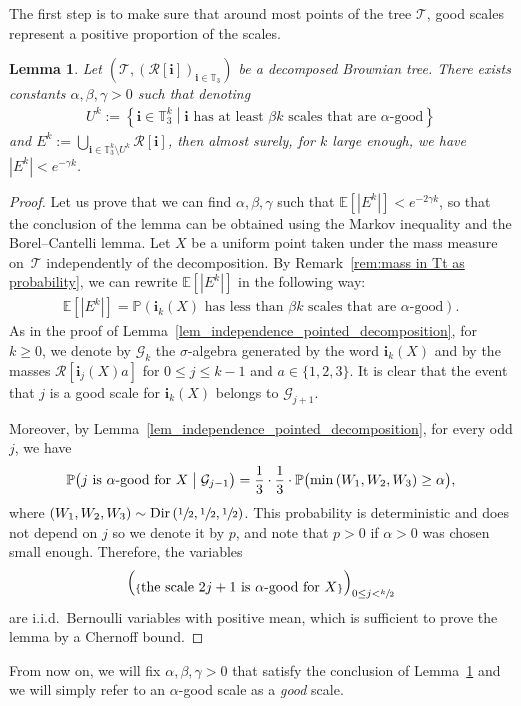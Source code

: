 \documentclass[11pt]{article}
\makeatletter
\let\backslash\setminus
\DeclareRobustCommand{\mathbbm}[1]{\csname jepbb@#1\endcsname}
\newcommand{\Ec}[1]{\mathbb{E} \left[#1\right]}
\newcommand{\Pp}[1]{\mathbb{P} \left(#1\right)}
\newcommand{\bPp}[1]{\mathbb{P} \bigl(#1\bigr)}
\newcommand{\bPpsq}[2]{\mathbb{P} \bigl(#1\bigm|#2\bigr)}
\newcommand{\enstq}[2]{\left\lbrace#1\mathrel{}\middle|\mathrel{}#2\right\rbrace}
\newcommand{\Tt}{\mathcal{T}}
\newcommand{\Rr}{\mathcal{R}}
\newcommand{\ii}{\mathbf{i}}
\newcommand{\Dir}{\mathrm{Dir}}
\theoremstyle{plain}
\newtheorem{lemma}[theorem]{Lemma}
\theoremstyle{definition}
\numberwithin{equation}{section}
\makeatother
\begin{document}
The first step is to make sure that around most points of the tree $\Tt$, good scales represent a positive proportion of the scales.
\begin{lemma}\label{lem_many_good_scales}
Let $\left( \Tt, \left( \Rr[\ii] \right)_{\ii \in \mathbb{T}_3} \right)$ be a decomposed Brownian tree.
There exists constants $\alpha, \beta, \gamma>0$ such that denoting
\begin{align*}
U^k:= \enstq{\ii \in \mathbb{T}_3^k}{\ii \mbox{ has at least $\beta k$ scales that are $\alpha$-good}}
\end{align*}
and $E^k:=\bigcup_{\ii \in \mathbb{T}_3^k \backslash U^k} \Rr[\ii]$, then almost surely, for $k$ large enough, we have
$|E^k| < e^{-\gamma k }$.
\end{lemma}

\begin{proof}
Let us prove that we can find $\alpha,\beta,\gamma$ such that $\Ec{|E^k|}<e^{-2\gamma k}$, so that the conclusion of the lemma can be obtained using the Markov inequality and the Borel--Cantelli lemma.
Let $X$ be a uniform point taken under the mass measure on~$\Tt$ independently of the decomposition.
By Remark~\ref{rem:mass in Tt as probability}, we can rewrite $\Ec{|E^k|}$ in the following way:
\begin{align*}
\Ec{|E^k|}
= \Pp{\ii_k(X) \mbox{ has less than $\beta k$ scales that are $\alpha$-good}}.
\end{align*}
As in the proof of Lemma~\ref{lem_independence_pointed_decomposition}, for $k \geq 0$, we denote by $\mathcal{G}_k$ the $\sigma$-algebra generated by the word $\ii_k(X)$ and by the masses $\Rr[\ii_j (X) a]$ for $0 \leq j \leq k-1$ and $a \in \{1,2,3\}$. It is clear that the event that $j$ is a good scale for $\ii_k(X)$ belongs to $\mathcal{G}_{j+1}$.

Moreover, by Lemma~\ref{lem_independence_pointed_decomposition}, for every odd $j$, we have
\begin{align} \label{eq:probability that next scale is good}
\bPpsq{\mbox{$j$ is $\alpha$-good for $X$}}{ \mathcal{G}_{j-1}} = \frac{1}{3} \cdot \frac{1}{3} \cdot \bPp{ \min \left( W_1, W_2, W_3 \right) \geq \alpha},
\end{align}
where $(W_1,W_2,W_3) \sim \Dir \left( \sfrac12, \sfrac12, \sfrac12 \right)$.
This probability is deterministic and does not depend on $j$ so we denote it by $p$, and note that $p>0$ if $\alpha>0$ was chosen small enough.
Therefore, the variables
\begin{align*}
\left( \mathbbm{1}_{\{\mbox{the scale $2j+1$ is $\alpha$-good for $X$}\}} \right)_{0 \leq j < \sfrac{k}{2}}
\end{align*}
are i.i.d.\ Bernoulli variables with positive mean, which is sufficient to prove the lemma by a Chernoff bound.
\end{proof}
From now on, we will fix $\alpha, \beta, \gamma>0$ that satisfy the conclusion of Lemma~\ref{lem_many_good_scales} and we will simply refer to an $\alpha$-good scale as a \emph{good} scale.
\end{document}
